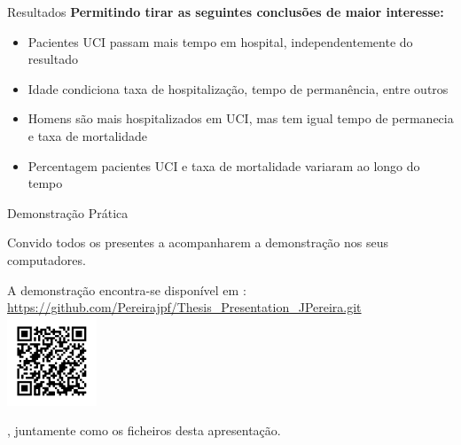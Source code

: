 \documentclass[pdf]
{beamer}
\begin{document}
\begin{frame}{Resultados}
		\textbf{Permitindo tirar as seguintes conclusões de maior interesse:}
		\vspace{0.5cm}
		\begin{itemize}
			\item Pacientes UCI passam mais tempo em hospital, independentemente do resultado
			\item Idade condiciona taxa de hospitalização, tempo de permanência, entre outros
			\item Homens são mais hospitalizados em UCI, mas tem igual tempo de permanecia e taxa de mortalidade
			\item Percentagem pacientes UCI e taxa de mortalidade variaram ao longo do tempo
		\end{itemize}
	
	
\end{frame}

\begin{frame}{Demonstração Prática}

\alert{\Large Convido todos os presentes a acompanharem a demonstração nos seus computadores.}
\vspace{0.4cm}
\centering

A demonstração encontra-se disponível em :
\vspace{0.2cm}
\scriptsize{
\url{https://github.com/Pereirajpf/Thesis_Presentation_JPereira.git}
}
\includegraphics[width=0.2\textwidth]{Imagens/qrcode_apresentação.png}
\vspace{0.4cm}

, juntamente como os ficheiros desta apresentação.

\end{frame}

\end{document}
